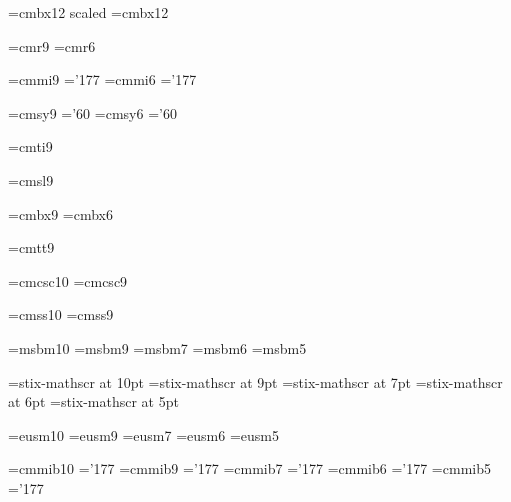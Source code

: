 \font\bigbf=cmbx12 scaled  %
\font\twelvebf=cmbx12 %

\font\ninerm=cmr9
\font\sixrm=cmr6

\font\ninei=cmmi9 \skewchar\ninei='177
\font\sixi=cmmi6  \skewchar\sixi='177

\font\ninesy=cmsy9 \skewchar\ninesy='60
\font\sixsy=cmsy6  \skewchar\sixsy='60

\font\nineit=cmti9

\font\ninesl=cmsl9

\font\ninebf=cmbx9
\font\sixbf=cmbx6

\font\ninett=cmtt9

\font\tensc=cmcsc10
\font\ninesc=cmcsc9

\font\tenss=cmss10
\font\niness=cmss9

\font\tenbb=msbm10
\font\ninebb=msbm9
\font\sevenbb=msbm7
\font\sixbb=msbm6
\font\fivebb=msbm5

\font\tenscr=stix-mathscr at 10pt
\font\ninescr=stix-mathscr at 9pt
\font\sevenscr=stix-mathscr at 7pt
\font\sixscr=stix-mathscr at 6pt
\font\fivescr=stix-mathscr at 5pt

\font\teneucal=eusm10
\font\nineeucal=eusm9
\font\seveneucal=eusm7
\font\sixeucal=eusm6
\font\fiveeucal=eusm5

\font\tenbmit=cmmib10  \skewchar\tenbmit='177
\font\ninebmit=cmmib9  \skewchar\ninebmit='177
\font\sevenbmit=cmmib7 \skewchar\sevenbmit='177
\font\sixbmit=cmmib6   \skewchar\sixbmit='177
\font\fivebmit=cmmib5  \skewchar\fivebmit='177

\chardef{}
\chardef{}
\chardef{}
\chardef{}
\newfam\scfam
\newfam\ssfam
\newfam\bbfam
\newfam\scrfam
\newfam\eucalfam
\newfam\bmitfam

\def\initfam#1#2#3#4{%
	\textfont#1=#2%
	\scriptfont#1=#3%
	\scriptscriptfont#1=#4}

\def\bb{\fam=\bbfam}
\def\scr{\fam=\scrfam}
\def\eucal{\fam=\eucalfam}
\def\bmit{\fam=\bmitfam}

